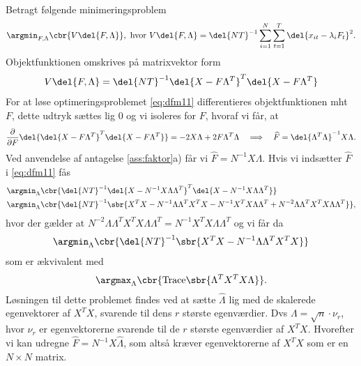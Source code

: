 Betragt følgende minimeringsproblem
\begin{align*}
\argmin_{F, \Lambda} \cbr{V \del{F, \Lambda}}, \text{ hvor } V \del{F, \Lambda} = \del{NT}^{-1} \sum_{i=1}^N \sum_{t=1}^T \del{x_{it} -\lambda_i F_t}^2. 
\end{align*}
Objektfunktionen omskrives på matrixvektor form
\begin{align}
V \del{F, \Lambda} = \del{NT}^{-1} \del{X - F \Lambda^T}^T \del{X - F \Lambda^T} \label{eq:dfm11}
\end{align}
For at løse optimeringsproblemet \eqref{eq:dfm11} differentieres objektfunktionen mht \(F\), dette udtryk sættes lig 0 og vi isoleres for \(F\), hvoraf vi får, at
\begin{align*}
\frac{\partial}{\partial F} \del{\del{X - F \Lambda^T}^T \del{X - F \Lambda^T}} = -2 X \Lambda + 2 F \Lambda^T \Lambda \quad \Longrightarrow \quad \widehat{F} = \del{\Lambda^T \Lambda}^{-1} X \Lambda.
\end{align*}
Ved anvendelse af antagelse \ref{ass:faktor}a) får vi  \(\widehat{F} = N^{-1} X \Lambda\).
Hvis vi indsætter \(\widehat{F}\) i \eqref{eq:dfm11} fås
\begin{align*}
&\argmin_\Lambda \cbr{\del{NT}^{-1} \del{X - N^{-1} X \Lambda \Lambda^T}^T \del{X - N^{-1} X \Lambda \Lambda^T}} \\
&\argmin_\Lambda \cbr{\del{NT}^{-1} \sbr{X^T X - N^{-1} \Lambda \Lambda^T X^T X - N^{-1} X^T X \Lambda \Lambda^T + N^{-2} \Lambda \Lambda^T X^T X \Lambda \Lambda^T}},
\end{align*}
hvor der gælder at \(N^{-2} \Lambda \Lambda^T X^T X \Lambda \Lambda^T = N^{-1} X^T X \Lambda \Lambda^T\) og vi får da
\begin{align*}
\argmin_\Lambda \cbr{\del{NT}^{-1} \sbr{X^T X - N^{-1} \Lambda \Lambda^T X^T X}}
\end{align*}
som er ækvivalent med
\begin{align*}
\argmax_\Lambda \cbr{ \text{Trace} \sbr{\Lambda^T X^T X \Lambda}}.
\end{align*}
Løsningen til dette problemet findes ved at sætte \(\widehat{\Lambda}\) lig med de skalerede egenvektorer af \(X^T X\), svarende til dens \(r\) største egenværdier.
Dvs \(\Lambda = \sqrt{n} \cdot \nu_r\), hvor \(\nu_r\) er egenvektorerne svarende til de \(r\) største egenværdier af \(X^T X\).
Hvorefter vi kan udregne \(\widehat{F} = N^{-1} X \widehat{\Lambda}\), som altså kræver egenvektorerne af \(X^T X\) som er en \(N \times N\) matrix.

